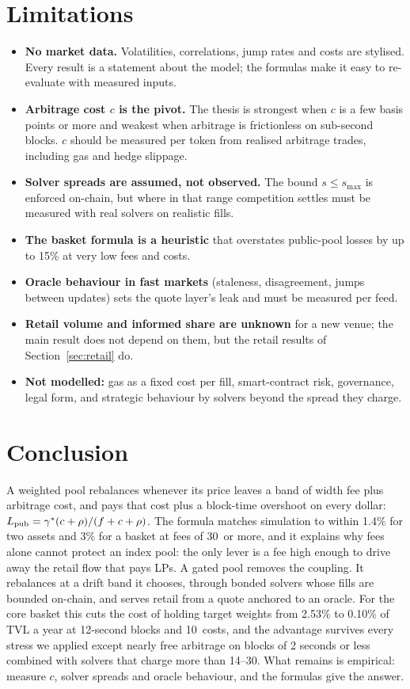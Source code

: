 \section{Limitations}
\label{sec:limits}
\begin{itemize}
\item \textbf{No market data.} Volatilities, correlations, jump rates and costs are stylised. Every result is a statement about the model; the formulas make it easy to re-evaluate with measured inputs.
\item \textbf{Arbitrage cost $c$ is the pivot.} The thesis is strongest when $c$ is a few basis points or more and weakest when arbitrage is frictionless on sub-second blocks. $c$ should be measured per token from realised arbitrage trades, including gas and hedge slippage.
\item \textbf{Solver spreads are assumed, not observed.} The bound $s\le s_{\max}$ is enforced on-chain, but where in that range competition settles must be measured with real solvers on realistic fills.
\item \textbf{The basket formula is a heuristic} that overstates public-pool losses by up to 15\% at very low fees and costs.
\item \textbf{Oracle behaviour in fast markets} (staleness, disagreement, jumps between updates) sets the quote layer's leak and must be measured per feed.
\item \textbf{Retail volume and informed share are unknown} for a new venue; the main result does not depend on them, but the retail results of Section~\ref{sec:retail} do.
\item \textbf{Not modelled:} gas as a fixed cost per fill, smart-contract risk, governance, legal form, and strategic behaviour by solvers beyond the spread they charge.
\end{itemize}

\section{Conclusion}
\label{sec:concl}
A weighted pool rebalances whenever its price leaves a band of width fee plus arbitrage cost, and pays that cost plus a block-time overshoot on every dollar: $L_{\mathrm{pub}}=\gamma^{*}(c+\rho)/(f+c+\rho)$. The formula matches simulation to within 1.4\% for two assets and 3\% for a basket at fees of 30\bps\ or more, and it explains why fees alone cannot protect an index pool: the only lever is a fee high enough to drive away the retail flow that pays LPs. A gated pool removes the coupling. It rebalances at a drift band it chooses, through bonded solvers whose fills are bounded on-chain, and serves retail from a quote anchored to an oracle. For the core basket this cuts the cost of holding target weights from 2.53\% to 0.10\% of TVL a year at 12-second blocks and 10\bps\ costs, and the advantage survives every stress we applied except nearly free arbitrage on blocks of 2 seconds or less combined with solvers that charge more than 14--30\bps. What remains is empirical: measure $c$, solver spreads and oracle behaviour, and the formulas give the answer.

